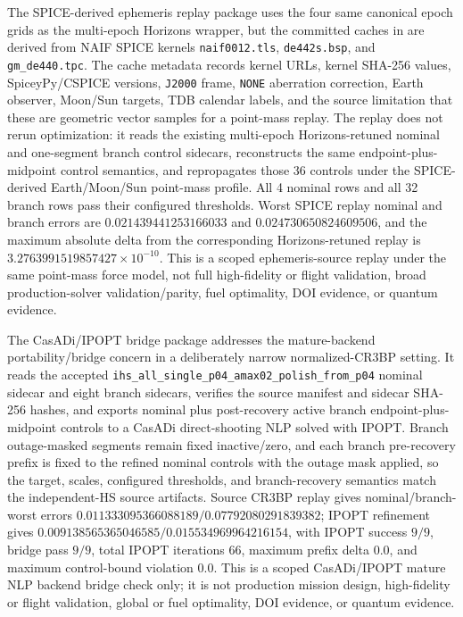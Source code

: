 \documentclass[11pt]{article}
\begin{document}
The SPICE-derived ephemeris replay package uses the four same canonical epoch grids as the multi-epoch Horizons wrapper, but the committed caches in  are derived from NAIF SPICE kernels \texttt{naif0012.tls}, \texttt{de442s.bsp}, and \texttt{gm\_de440.tpc}. The cache metadata records kernel URLs, kernel SHA-256 values, SpiceyPy/CSPICE versions, \texttt{J2000} frame, \texttt{NONE} aberration correction, Earth observer, Moon/Sun targets, TDB calendar labels, and the source limitation that these are geometric vector samples for a point-mass replay. The replay does not rerun optimization: it reads the existing multi-epoch Horizons-retuned nominal and one-segment branch control sidecars, reconstructs the same endpoint-plus-midpoint control semantics, and repropagates those 36 controls under the SPICE-derived Earth/Moon/Sun point-mass profile. All 4 nominal rows and all 32 branch rows pass their configured thresholds. Worst SPICE replay nominal and branch errors are $0.021439441253166033$ and $0.024730650824609506$, and the maximum absolute delta from the corresponding Horizons-retuned replay is $3.2763991519857427\times10^{-10}$. This is a scoped ephemeris-source replay under the same point-mass force model, not full high-fidelity or flight validation, broad production-solver validation/parity, fuel optimality, DOI evidence, or quantum evidence.

\begin{table}[htbp]
\centering
\caption{Independent-HS SPICE-derived ephemeris replay of the multi-epoch Horizons-retuned controls. The package replays already-retuned controls under compact SPICE-derived Moon/Sun vector caches without retuning or optimization rerun; it is point-mass ephemeris-source replay, not full high-fidelity validation.}
\label{tab:supp_independent_hs_spice_ephemeris_replay}
\resizebox{\textwidth}{!}{}
\end{table}

The CasADi/IPOPT bridge package addresses the mature-backend portability/bridge concern in a deliberately narrow normalized-CR3BP setting. It reads the accepted \texttt{ihs\_all\_single\_p04\_amax02\_polish\_from\_p04} nominal sidecar and eight branch sidecars, verifies the source manifest and sidecar SHA-256 hashes, and exports nominal plus post-recovery active branch endpoint-plus-midpoint controls to a CasADi direct-shooting NLP solved with IPOPT. Branch outage-masked segments remain fixed inactive/zero, and each branch pre-recovery prefix is fixed to the refined nominal controls with the outage mask applied, so the target, scales, configured thresholds, and branch-recovery semantics match the independent-HS source artifacts. Source CR3BP replay gives nominal/branch-worst errors $0.011333095366088189/0.07792080291839382$; IPOPT refinement gives $0.009138565365046585/0.015534969964216154$, with IPOPT success $9/9$, bridge pass $9/9$, total IPOPT iterations $66$, maximum prefix delta $0.0$, and maximum control-bound violation $0.0$. This is a scoped CasADi/IPOPT mature NLP backend bridge check only; it is not production mission design, high-fidelity or flight validation, global or fuel optimality, DOI evidence, or quantum evidence.
\end{document}
